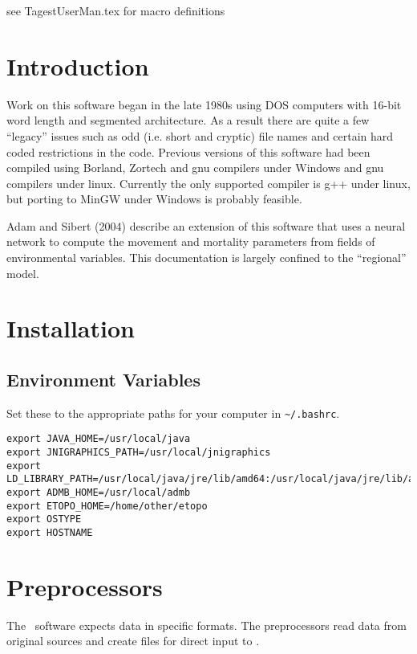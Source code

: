  see TagestUserMan.tex for macro definitions

\setcounter{page}{1}



\section*{Introduction}
Work on this software began in the late 1980s using DOS computers with
16-bit word length and segmented architecture. As a result there are
quite a few ``legacy'' issues such as odd (i.e. short and cryptic)
file names and certain hard coded restrictions in the code.
Previous versions of this software had been compiled using
Borland, Zortech and gnu compilers under Windows and gnu compilers
under linux. Currently the only supported compiler is g++ under
linux, but porting to MinGW under Windows is probably feasible. 

Adam and Sibert (2004) describe an extension of this software that
uses a neural network to compute the movement and mortality parameters
from fields of environmental variables. This documentation is largely
confined to the ``regional'' model.

\section*{Installation}
\subsection*{Environment Variables}
Set these to the appropriate paths for your computer in \verb|~/.bashrc|.
{\par{}\normalbaselineskip
\begin{verbatim}
export JAVA_HOME=/usr/local/java
export JNIGRAPHICS_PATH=/usr/local/jnigraphics
export LD_LIBRARY_PATH=/usr/local/java/jre/lib/amd64:/usr/local/java/jre/lib/amd64/serve
export ADMB_HOME=/usr/local/admb
export ETOPO_HOME=/home/other/etopo
export OSTYPE
export HOSTNAME
\end{verbatim}
\par}

\section*{Preprocessors}
The \TT\ software expects data in specific formats. The preprocessors
read data from original sources and create files for direct input to
\TT. 

